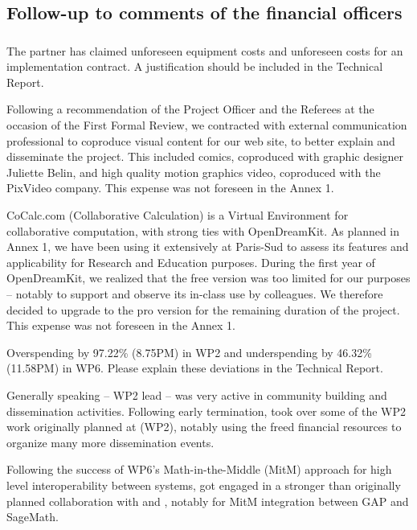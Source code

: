 \subsection{Follow-up to comments of the financial officers}

\subsubsection{}

\begin{EUcomment}
  The partner has claimed unforeseen equipment costs and unforeseen
  costs for an implementation contract. A justification should be
  included in the Technical Report.
\end{EUcomment}

Following a recommendation of the Project Officer and the Referees at
the occasion of the First Formal Review, we contracted with external
communication professional to coproduce visual content for our web
site, to better explain and disseminate the project. This included
comics, coproduced with graphic designer Juliette Belin, and high
quality motion graphics video, coproduced with the PixVideo company.
This expense was not foreseen in the Annex 1.

CoCalc.com (Collaborative Calculation) is a Virtual Environment for
collaborative computation, with strong ties with OpenDreamKit. As
planned in Annex 1, we have been using it extensively at Paris-Sud to
assess its features and applicability for Research and Education
purposes. During the first year of OpenDreamKit, we realized that the
free version was too limited for our purposes -- notably to support
and observe its in-class use by colleagues. We therefore decided to
upgrade to the pro version for the remaining duration of the project.
This expense was not foreseen in the Annex 1.

\begin{EUcomment}
  Overspending by 97.22\% (8.75PM) in WP2 and underspending by 46.32\% (11.58PM) in WP6.
  Please explain these deviations in the Technical Report.
\end{EUcomment}
Generally speaking  -- WP2 lead -- was very active in
community building and dissemination activities. Following
 early termination,  took over some of the WP2
work originally planned at  (WP2), notably using the freed
financial resources to organize many more dissemination events.

Following the success of WP6's Math-in-the-Middle (MitM) approach for
high level interoperability between systems,  got engaged in
a stronger than originally planned collaboration with  and
, notably for MitM integration between GAP and SageMath.

